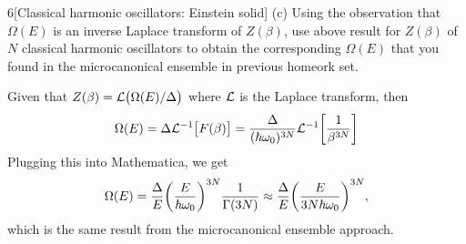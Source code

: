 \documentclass[12pt]{article}
\begin{document}
\begin{problem}{6}[Classical harmonic oscillators: Einstein solid]
(c) Using the observation that $\Omega(E)$ is an inverse Laplace transform of
$Z(\beta)$, use above result for $Z(\beta)$ of $N$ classical harmonic
oscillators to obtain the corresponding $\Omega(E)$ that you found in the
microcanonical ensemble in previous homeork set.
\begin{solution}
    Given that $Z(\beta)=\mathcal{L}\qty(\Omega(E)/\Delta)$ where $\mathcal{L}$ is the Laplace
    transform, then
    \begin{equation}
        \Omega(E)=\Delta\mathcal{L}^{-1}\qty[F(\beta)] 
        =\frac{\Delta}{(\hbar\omega_0)^{3N}}\mathcal{L}^{-1}\qty[\frac1{\beta^{3N}}]
    \end{equation}
    Plugging this into Mathematica, we get
    \begin{equation}
        \Omega(E)=\frac{\Delta}{E}\qty(\frac{E}{\hbar\omega_0})^{3N}\frac1{\Gamma(3N)}
        \approx\frac{\Delta}{E}\qty(\frac{E}{3N\hbar\omega_0})^{3N},
    \end{equation}
    which is the same result from the microcanonical ensemble approach.
\end{solution}
\end{problem}
\newpage
\end{document}
